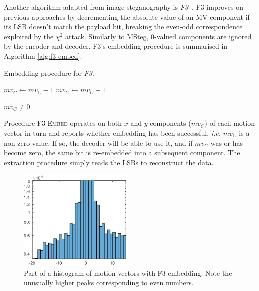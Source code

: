 \documentclass[12pt,british,twoside,notitlepage,usenames,dvipsnames,hypens,final]{report}
\numberwithin{equation}{section}
\numberwithin{figure}{section}
\begin{document}
Another algorithm adapted from image steganography is \emph{F3}~\cite{f5}. F3 improves on previous approaches by decrementing the absolute value of an MV component if its LSB doesn't match the payload bit, breaking the even-odd correspondence exploited by the $\chi^2$ attack. Similarly to MSteg, 0-valued components are ignored by the encoder and decoder. F3's embedding procedure is summarised in Algorithm \ref{alg:f3-embed}. 

\begin{algorithm}[!htp]
\caption{Embedding procedure for \emph{F3}.}
\label{alg:f3-embed}
\begin{algorithmic}
\Else
        	\State $mv_C \gets mv_C - 1$
        \Else
        \State $mv_C \gets mv_C + 1$
        \EndIf
    \EndIf
    
    \State \Return $mv_C \neq 0$
\EndIf
\EndProcedure
\end{algorithmic}
\end{algorithm}

Procedure \textsc{F3-Embed} operates on both $x$ and $y$ components ($mv_C$) of each motion vector in turn and reports whether embedding has been successful, \emph{i.e.} $mv_C$ is a non-zero value. If so, the decoder will be able to use it, and if $mv_C$ was or has become zero, the same bit is re-embedded into a subsequent component. The extraction procedure simply reads the LSBs to reconstruct the data.

\begin{figure}
\vspace{-15pt}
\centering
\includegraphics[width=5.5cm]{img/f3-hist.eps}
\caption{Part of a histogram of motion vectors with F3 embedding. Note the unusually higher peaks corresponding to even numbers.}
\label{fig:f3-hist}
\end{figure}
\end{document}
